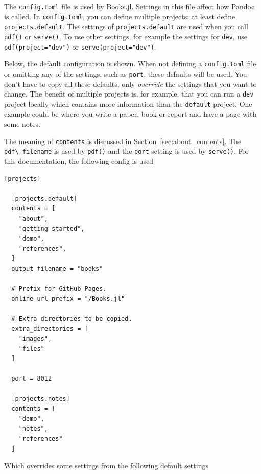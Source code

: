 \documentclass[
  14pt
  american,
  paper=a4,
  ,captions=tableheading
]{scrreprt}
\newcommand{\passthrough}[1]{#1}
\begin{document}
The \passthrough{\lstinline!config.toml!} file is used by Books.jl.
Settings in this file affect how Pandoc is called. In
\passthrough{\lstinline!config.toml!}, you can define multiple projects;
at least define \passthrough{\lstinline!projects.default!}. The settings
of \passthrough{\lstinline!projects.default!} are used when you call
\passthrough{\lstinline!pdf()!} or \passthrough{\lstinline!serve()!}. To
use other settings, for example the settings for
\passthrough{\lstinline!dev!}, use
\passthrough{\lstinline!pdf(project="dev")!} or
\passthrough{\lstinline!serve(project="dev")!}.

Below, the default configuration is shown. When not defining a
\passthrough{\lstinline!config.toml!} file or omitting any of the
settings, such as \passthrough{\lstinline!port!}, these defaults will be
used. You don't have to copy all these defaults, only \emph{override}
the settings that you want to change. The benefit of multiple projects
is, for example, that you can run a \passthrough{\lstinline!dev!}
project locally which contains more information than the
\passthrough{\lstinline!default!} project. One example could be where
you write a paper, book or report and have a page with some notes.

The meaning of \passthrough{\lstinline!contents!} is discussed in
Section~\ref{sec:about_contents}. The
\passthrough{\lstinline!pdf\_filename!} is used by
\passthrough{\lstinline!pdf()!} and the \passthrough{\lstinline!port!}
setting is used by \passthrough{\lstinline!serve()!}. For this
documentation, the following config is used

\begin{lstlisting}
[projects]

  [projects.default]
  contents = [
    "about",
    "getting-started",
    "demo",
    "references",
  ]
  output_filename = "books"

  # Prefix for GitHub Pages.
  online_url_prefix = "/Books.jl"

  # Extra directories to be copied.
  extra_directories = [
    "images",
    "files"
  ]

  port = 8012

  [projects.notes]
  contents = [
    "demo",
    "notes",
    "references"
  ]
\end{lstlisting}

Which overrides some settings from the following default settings
\end{document}
